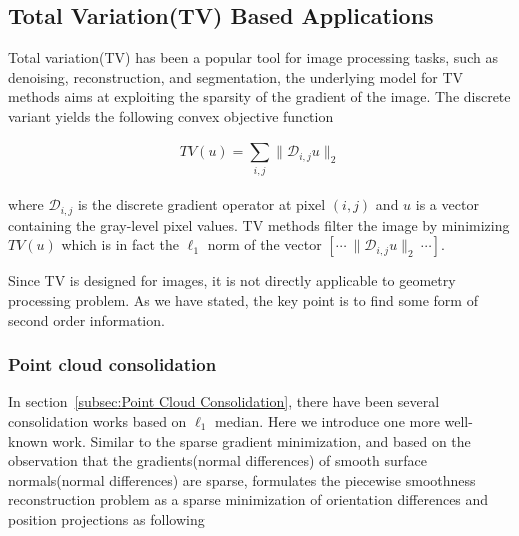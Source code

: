 \subsection{Total Variation(TV) Based Applications}
\label{subsec:TV Applications}

%
%

Total variation(TV) has been a popular tool for image processing tasks,
such as denoising, reconstruction, and segmentation\cite{chambolle2010introduction},
the underlying model for TV methods aims at exploiting the sparsity of the gradient of the image.
The discrete variant yields the following convex objective function

\small{
\begin{equation}
 \label{eq:descreteTV}
 TV(u)=\sum_{i,j}^{}\|\mathcal{D}_{i,j}u\|_2
\end{equation}
}
\\
where $\mathcal{D}_{i,j}$ is the discrete gradient operator at pixel $(i,j)$ and $u$ is a vector containing the gray-level pixel values. TV methods filter the image by minimizing $TV(u)$ which is in fact the $\ell_1$ norm of the vector $[\cdots~\|\mathcal{D}_{i,j}u\|_2~\cdots]$.

Since TV is designed for images, it is not directly applicable to geometry processing problem.
As we have stated, the key point is to find some form of second order information.


\subsubsection{Point cloud consolidation}
\label{subsubsec:TVPoint cloud consolidation}

In section~\ref{subsec:Point Cloud Consolidation}, there have been several consolidation works based on $\ell_1$ median.
Here we introduce one more well-known work.
Similar to the sparse gradient minimization, and based on the observation that the gradients(normal differences) of smooth surface normals(normal differences) are sparse,
\cite{avron2010L1} formulates the piecewise smoothness reconstruction problem as a sparse minimization of orientation differences and position projections as following

